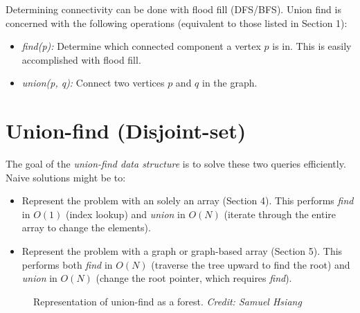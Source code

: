 \documentclass{article}
\begin{document}
Determining connectivity can be done with flood fill (DFS/BFS).
Union find is concerned with the following operations (equivalent to those listed in Section 1):
\begin{itemize}
    \item \textit{find(p):} Determine which connected component a vertex $p$ is in. This is easily accomplished with flood fill.
    \item \textit{union(p, q):} Connect two vertices $p$ and $q$ in the graph.
\end{itemize}

\pagebreak

\section{Union-find (Disjoint-set)}
The goal of the \textit{union-find data structure} is to solve these two queries efficiently. Naive solutions might be to:
\begin{itemize}
    \item Represent the problem with an solely an array (Section 4). This performs \textit{find} in $O(1)$ (index lookup) and \textit{union} in $O(N)$ (iterate through the entire array to change the elements).
    \item Represent the problem with a graph or graph-based array (Section 5). This performs both \textit{find} in $O(N)$ (traverse the tree upward to find the root) and \textit{union} in $O(N)$ (change the root pointer, which requires \textit{find}).
\end{itemize}

\begin{figure}[h]
\centering
{}
\caption{Representation of union-find as a forest. \textit{Credit: Samuel Hsiang}}
\end{figure}
\end{document}
